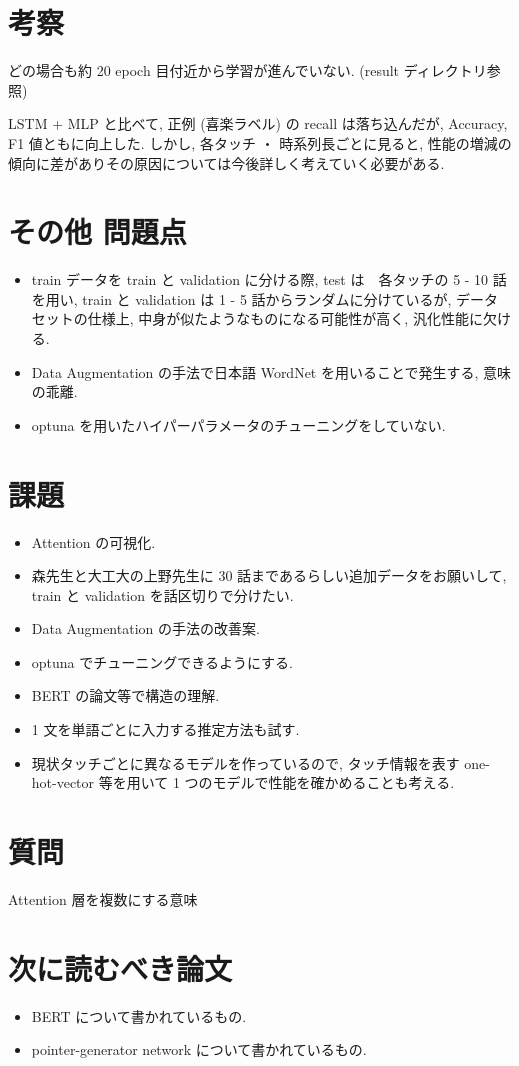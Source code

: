 \documentclass[twocolumn]{jarticle}     %
\begin{document}
\section{考察}

どの場合も約 20 epoch 目付近から学習が進んでいない. (result ディレクトリ参照)

LSTM + MLP と比べて, 正例 (喜楽ラベル) の recall は落ち込んだが, Accuracy, F1 値ともに向上した. しかし, 各タッチ ・ 時系列長ごとに見ると, 性能の増減の傾向に差がありその原因については今後詳しく考えていく必要がある.


\section{その他 問題点}
\begin{itemize}
  \item train データを train と validation に分ける際, test は　各タッチの 5 - 10 話を用い, train と validation は 1 - 5 話からランダムに分けているが, データセットの仕様上, 中身が似たようなものになる可能性が高く, 汎化性能に欠ける.
  \item Data Augmentation の手法で日本語 WordNet を用いることで発生する, 意味の乖離.
  \item optuna を用いたハイパーパラメータのチューニングをしていない.
\end{itemize}

\section{課題}
\begin{itemize}
  \item Attention の可視化.
  \item 森先生と大工大の上野先生に 30 話まであるらしい追加データをお願いして, train と validation を話区切りで分けたい.
  \item Data Augmentation の手法の改善案.
  \item optuna でチューニングできるようにする.
  \item BERT の論文等で構造の理解.
  \item 1 文を単語ごとに入力する推定方法も試す.
  \item 現状タッチごとに異なるモデルを作っているので, タッチ情報を表す one-hot-vector 等を用いて 1 つのモデルで性能を確かめることも考える.
\end{itemize}

\section{質問}
Attention 層を複数にする意味
\section{次に読むべき論文}
\begin{itemize}
  \item BERT について書かれているもの.
  \item pointer-generator network について書かれているもの.
\end{itemize}




\end{document}
